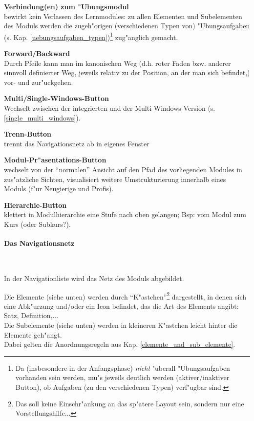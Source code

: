\begin{list_sabina}
        \item \textbf{Verbindung(en) zum "Ubungsmodul}\\
	bewirkt kein Verlassen des Lernmodules:
	zu allen Elementen und Subelementen des Moduls werden 
	die zugeh"origen (verschiedenen Typen von) "Ubungsaufgaben
	(s. Kap. \ref{uebungsaufgaben_typen})\footnote{Da (insbesondere
        in der Anfangsphase) \textit{nicht} "uberall "Ubungsaufgaben
	vorhanden sein werden, mu"s jeweils deutlich werden 
	(aktiver/inaktiver Button), ob 
	Aufgaben (zu den verschiedenen Typen) verf"ugbar sind.} 
	zug"anglich gemacht.
        \item \textbf{Forward/Backward}\\
        Durch Pfeile kann man im kanonischen Weg (d.h. roter Faden
        bzw. anderer sinnvoll definierter Weg, jeweils relativ zu der
        Position, an der man sich befindet,) vor- und
        zur"uckgehen. 
        \item \textbf{Multi/Single-Windows-Button}\\
        Wechselt zwischen der integrierten und der 
	Multi-Windows-Version (s. \ref{single_multi_windows}).
        \item \textbf{Trenn-Button}\\
        trennt das Navigationsnetz ab in eigenes Fenster
        \item \textbf{Modul-Pr"asentations-Button}\\
        wechselt von der ``normalen'' Ansicht auf den Pfad
	des vorliegenden Modules in zus"atzliche Sichten, 
	visualisiert weitere Umstrukturierung innerhalb eines Moduls
	(f"ur Neugierige und Profis). 
        \item \textbf{Hierarchie-Button}\\
        klettert in Modulhierarchie eine Stufe nach
        oben gelangen; Bsp: vom Modul zum Kurs (oder Subkurs?).
\end{list_sabina}


\paragraph{Das Navigationsnetz}\label{navigationsnetz}

\mbox{ }
\vspace{0mm}

In der Navigationliste wird das Netz des Moduls abgebildet. 

Die Elemente (siehe unten) werden durch ``K"astchen''\footnote{Das soll keine
Einschr"ankung an das sp"atere Layout sein, sondern nur eine Vorstellungshilfe...} 
dargestellt, in denen sich eine Abk"urzung und/oder ein Icon befindet, das
die Art des Elements angibt: Satz, Definition,...\\
Die Subelemente (siehe unten) werden in kleineren K"astchen leicht hinter die
Elemente geh"angt.\\
Dabei gelten die Anordnungsregeln aus Kap. \ref{elemente_und_sub_elemente}.

